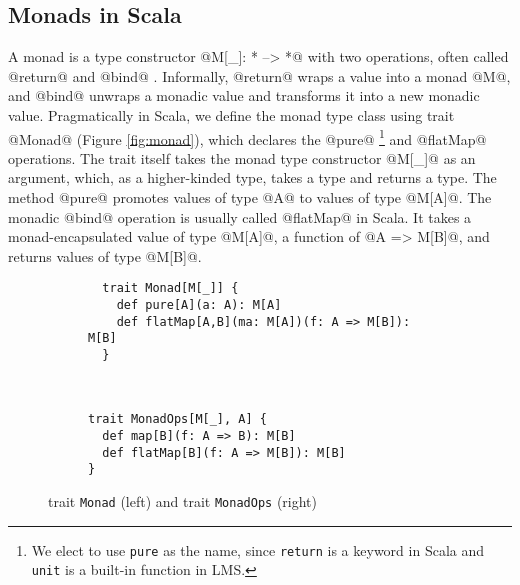 
\iffalse
We will give the concrete semantics using a big-step definitional
interpreter. The interpreter is a recursive function that takes the program AST,
environment, and store, and returns the evaluated value and the accompanying
store. The environment is a mapping from identifiers to addresses, and the store
is a mapping from addresses to values. We use the store to model recursion and
mutation in concrete semantics; it is also useful for polyvariant analysis. This
environment-and-store-passing style big-step interpreter is standard and can
also be obtained by refunctionalizing \cite{DBLP:conf/ppdp/AgerBDM03,
Wei:2018:RAA:3243631.3236800} a small-step CESK machine
\cite{DBLP:conf/popl/FelleisenF87}.
\fi

\subsection{Monads in Scala} \label{monadscala}

A monad is a type constructor @M[_]: * --> *@ with two operations, often called
@return@ and @bind@ \cite{Wadler:1992:EFP:143165.143169,
DBLP:journals/iandc/Moggi91}. Informally, @return@ wraps a value into a monad
@M@, and @bind@ unwraps a monadic value and transforms it into a new monadic value.
Pragmatically in Scala, we define the monad type class using trait @Monad@
(Figure \ref{fig:monad}), which declares the @pure@ \footnote{We elect to use
\texttt{pure} as the name, since \texttt{return} is a keyword in Scala and
\texttt{unit} is a built-in function in LMS.} and @flatMap@ operations. The
trait itself takes the monad type constructor @M[_]@ as an argument, which, as a
higher-kinded type, takes a type and returns a type. The method @pure@ promotes
values of type @A@ to values of type @M[A]@. The monadic @bind@ operation is
usually called @flatMap@ in Scala. It takes a monad-encapsulated value of type
@M[A]@, a function of @A => M[B]@, and returns values of type @M[B]@.

\begin{figure}[h!]
  \centering
  \vspace{-1em}
  \begin{subfigure}[b]{0.55\textwidth}
    \begin{lstlisting}
  trait Monad[M[_]] {
    def pure[A](a: A): M[A]
    def flatMap[A,B](ma: M[A])(f: A => M[B]): M[B]
  }
    \end{lstlisting}
  \end{subfigure}
  ~
  \begin{subfigure}[b]{0.4\textwidth}
    \begin{lstlisting}
trait MonadOps[M[_], A] {
  def map[B](f: A => B): M[B]
  def flatMap[B](f: A => M[B]): M[B]
}
    \end{lstlisting}
  \end{subfigure}
  \vspace{-1em}
  \caption{trait \texttt{Monad} (left) and trait \texttt{MonadOps} (right)} \label{fig:monad} \label{fig:monadops}
\end{figure}
\vspace{-1em}

